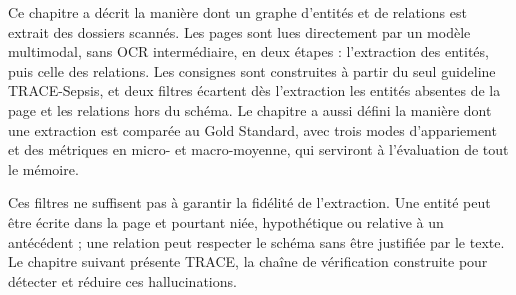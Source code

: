 Ce chapitre a décrit la manière dont un graphe d'entités et de relations est extrait des dossiers scannés. Les pages sont lues directement par un modèle multimodal, sans OCR intermédiaire, en deux étapes : l'extraction des entités, puis celle des relations. Les consignes sont construites à partir du seul guideline TRACE-Sepsis, et deux filtres écartent dès l'extraction les entités absentes de la page et les relations hors du schéma. Le chapitre a aussi défini la manière dont une extraction est comparée au Gold Standard, avec trois modes d'appariement et des métriques en micro- et macro-moyenne, qui serviront à l'évaluation de tout le mémoire.

Ces filtres ne suffisent pas à garantir la fidélité de l'extraction. Une entité peut être écrite dans la page et pourtant niée, hypothétique ou relative à un antécédent ; une relation peut respecter le schéma sans être justifiée par le texte. Le chapitre suivant présente TRACE, la chaîne de vérification construite pour détecter et réduire ces hallucinations.

